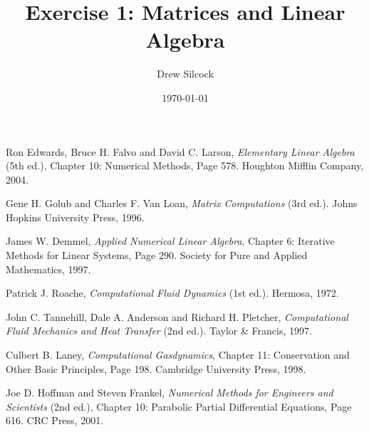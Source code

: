 \documentclass[aps,twocolumn,nobalancelastpage]{revtex4}
\begin{document}
\title{Exercise 1: Matrices and Linear Algebra}
\author{Drew Silcock}
\date{\today}

\maketitle







\begin{thebibliography}{99}

        Ron Edwards, Bruce H. Falvo and David C. Larson,
        \emph{Elementary Linear Algebra} (5th ed.),
        Chapter 10: Numerical Methods,
        Page 578.
        Houghton Mifflin Company,
        2004.

        Gene H. Golub and Charles F. Van Loan,
        \emph{Matrix Computations} (3rd ed.).
        Johns Hopkins University Press,
        1996.

        James W. Demmel,
        \emph{Applied Numerical Linear Algebra},
        Chapter 6: Iterative Methods for Linear Systems,
        Page 290.
        Society for Pure and Applied Mathematics,
        1997.

        Patrick J. Roache,
        \emph{Computational Fluid Dynamics} (1st ed.).
        Hermosa,
        1972.

        John C. Tannehill, Dale A. Anderson and Richard H. Pletcher,
        \emph{Computational Fluid Mechanics and Heat Transfer} (2nd ed.).
        Taylor \& Francis,
        1997.

        Culbert B. Laney,
        \emph{Computational Gasdynamics},
        Chapter 11: Conservation and Other Basic Principles,
        Page 198.
        Cambridge University Press,
        1998.

        Joe D. Hoffman and Steven Frankel,
        \emph{Numerical Methods for Engineers and Scientists} (2nd ed.),
        Chapter 10: Parabolic Partial Differential Equations,
        Page 616.
        CRC Press,
        2001.

\end{thebibliography}
\end{document}
